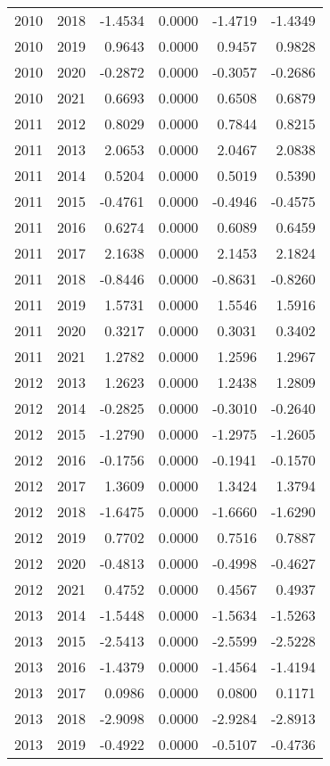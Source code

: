 \begin{tabular}{llrrrr}
2010 & 2018 & -1.4534 & 0.0000 & -1.4719 & -1.4349 \\
2010 & 2019 & 0.9643 & 0.0000 & 0.9457 & 0.9828 \\
2010 & 2020 & -0.2872 & 0.0000 & -0.3057 & -0.2686 \\
2010 & 2021 & 0.6693 & 0.0000 & 0.6508 & 0.6879 \\
2011 & 2012 & 0.8029 & 0.0000 & 0.7844 & 0.8215 \\
2011 & 2013 & 2.0653 & 0.0000 & 2.0467 & 2.0838 \\
2011 & 2014 & 0.5204 & 0.0000 & 0.5019 & 0.5390 \\
2011 & 2015 & -0.4761 & 0.0000 & -0.4946 & -0.4575 \\
2011 & 2016 & 0.6274 & 0.0000 & 0.6089 & 0.6459 \\
2011 & 2017 & 2.1638 & 0.0000 & 2.1453 & 2.1824 \\
2011 & 2018 & -0.8446 & 0.0000 & -0.8631 & -0.8260 \\
2011 & 2019 & 1.5731 & 0.0000 & 1.5546 & 1.5916 \\
2011 & 2020 & 0.3217 & 0.0000 & 0.3031 & 0.3402 \\
2011 & 2021 & 1.2782 & 0.0000 & 1.2596 & 1.2967 \\
2012 & 2013 & 1.2623 & 0.0000 & 1.2438 & 1.2809 \\
2012 & 2014 & -0.2825 & 0.0000 & -0.3010 & -0.2640 \\
2012 & 2015 & -1.2790 & 0.0000 & -1.2975 & -1.2605 \\
2012 & 2016 & -0.1756 & 0.0000 & -0.1941 & -0.1570 \\
2012 & 2017 & 1.3609 & 0.0000 & 1.3424 & 1.3794 \\
2012 & 2018 & -1.6475 & 0.0000 & -1.6660 & -1.6290 \\
2012 & 2019 & 0.7702 & 0.0000 & 0.7516 & 0.7887 \\
2012 & 2020 & -0.4813 & 0.0000 & -0.4998 & -0.4627 \\
2012 & 2021 & 0.4752 & 0.0000 & 0.4567 & 0.4937 \\
2013 & 2014 & -1.5448 & 0.0000 & -1.5634 & -1.5263 \\
2013 & 2015 & -2.5413 & 0.0000 & -2.5599 & -2.5228 \\
2013 & 2016 & -1.4379 & 0.0000 & -1.4564 & -1.4194 \\
2013 & 2017 & 0.0986 & 0.0000 & 0.0800 & 0.1171 \\
2013 & 2018 & -2.9098 & 0.0000 & -2.9284 & -2.8913 \\
2013 & 2019 & -0.4922 & 0.0000 & -0.5107 & -0.4736 \\

\end{tabular}
